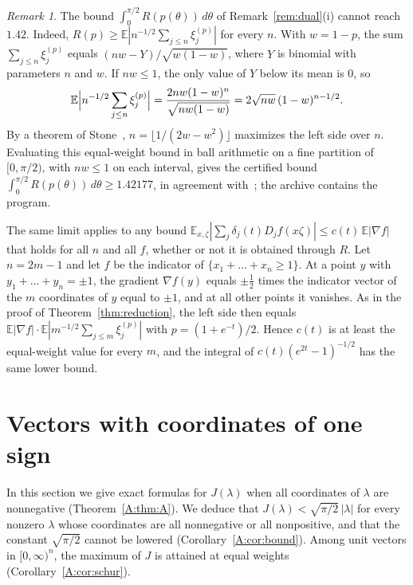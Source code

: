 \documentclass[11pt]{amsart}
\theoremstyle{remark}
\newtheorem{remark}[theorem]{Remark}
\numberwithin{equation}{section}
\newcommand{\E}{\mathbb{E}}
\newcommand{\CUBdec}{1.42}
\newcommand{\ISLimitLo}{1.42177}
\begin{document}
\begin{remark}\label{rem:islimit}
The bound $\int_0^{\pi/2}R(p(\theta))\,d\theta$ of Remark~\ref{rem:dual}(i) cannot reach $\CUBdec$. Indeed, $R(p)\ge\E|n^{-1/2}\sum_{j\le n}\xi_j^{(p)}|$ for every $n$. With $w=1-p$, the sum $\sum_{j\le n}\xi_j^{(p)}$ equals $(nw-Y)/\sqrt{w(1-w)}$, where $Y$ is binomial with parameters $n$ and $w$. If $nw\le1$, the only value of $Y$ below its mean is $0$, so
\[
\E\Bigl|n^{-1/2}\sum_{j\le n}\xi_j^{(p)}\Bigr|=\frac{2nw(1-w)^n}{\sqrt{nw(1-w)}}=2\sqrt{nw}\,(1-w)^{n-1/2}.
\]
By a theorem of Stone~\cite[Theorem~4.3.1]{Sto25}, $n=\lfloor1/(2w-w^2)\rfloor$ maximizes the left side over $n$. Evaluating this equal-weight bound in ball arithmetic on a fine partition of $[0,\pi/2)$, with $nw\le1$ on each interval, gives the certified bound $\int_0^{\pi/2}R(p(\theta))\,d\theta\ge\ISLimitLo$, in agreement with~\cite[Remark~1.3]{IS24}; the archive contains the program.

The same limit applies to any bound $\E_{x,\zeta}|\sum_j\delta_j(t)D_jf(x\zeta)|\le c(t)\,\E|\nabla f|$ that holds for all $n$ and all $f$, whether or not it is obtained through $R$. Let $n=2m-1$ and let $f$ be the indicator of $\{x_1+\dots+x_n\ge1\}$. At a point $y$ with $y_1+\dots+y_n=\pm1$, the gradient $\nabla f(y)$ equals $\pm\frac12$ times the indicator vector of the $m$ coordinates of $y$ equal to $\pm1$, and at all other points it vanishes. As in the proof of Theorem~\ref{thm:reduction}, the left side then equals $\E|\nabla f|\cdot\E|m^{-1/2}\sum_{j\le m}\xi_j^{(p)}|$ with $p=(1+e^{-t})/2$. Hence $c(t)$ is at least the equal-weight value for every $m$, and the integral of $c(t)(e^{2t}-1)^{-1/2}$ has the same lower bound.
\end{remark}

\section{Vectors with coordinates of one sign}\label{sec:sharp}

In this section we give exact formulas for $J(\lambda)$ when all coordinates of $\lambda$ are nonnegative (Theorem~\ref{A:thm:A}). We deduce that $J(\lambda)<\sqrt{\pi/2}\,|\lambda|$ for every nonzero $\lambda$ whose coordinates are all nonnegative or all nonpositive, and that the constant $\sqrt{\pi/2}$ cannot be lowered (Corollary~\ref{A:cor:bound}). Among unit vectors in $[0,\infty)^n$, the maximum of $J$ is attained at equal weights (Corollary~\ref{A:cor:schur}).
\end{document}
